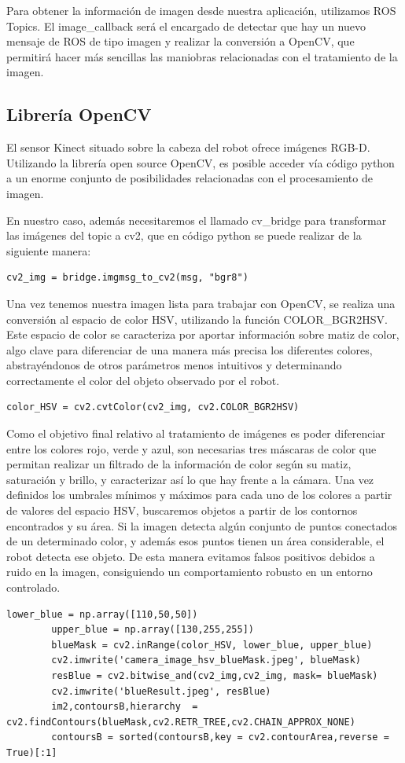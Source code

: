 \documentclass[12pt,spanish,chapterprefix, numbers=noenddot]{book}
\numberwithin{equation}{section}
\numberwithin{figure}{section}
\begin{document}
Para obtener la información de imagen desde nuestra aplicación, utilizamos ROS Topics. El image\_callback será el encargado de detectar que hay un nuevo mensaje de ROS de tipo imagen y realizar la conversión a OpenCV, que permitirá hacer más sencillas las maniobras relacionadas con el tratamiento de la imagen.
\subsection{Librería OpenCV} 
El sensor Kinect situado sobre la cabeza del robot ofrece imágenes RGB-D. Utilizando la librería open source OpenCV, es posible acceder vía código python a un enorme conjunto de posibilidades relacionadas con el procesamiento de imagen. \cite{open_cv} 

En nuestro caso, además necesitaremos el llamado cv\_bridge para transformar las imágenes del topic a cv2, que en código python se puede realizar de la siguiente manera: 
	\begin{lstlisting}[frame=single]    
    cv2_img = bridge.imgmsg_to_cv2(msg, "bgr8")
	\end{lstlisting}
Una vez tenemos nuestra imagen lista para trabajar con OpenCV, se realiza una conversión al espacio de color HSV, utilizando la función COLOR\_BGR2HSV. Este espacio de color se caracteriza por aportar información sobre matiz de color, algo clave para diferenciar de una manera más precisa los diferentes colores, abstrayéndonos de otros parámetros menos intuitivos y determinando correctamente el color del objeto observado por el robot. 
	\begin{lstlisting}[frame=single] 
    color_HSV = cv2.cvtColor(cv2_img, cv2.COLOR_BGR2HSV)
	\end{lstlisting}
Como el objetivo final relativo al tratamiento de imágenes es poder diferenciar entre los colores rojo, verde y azul, son necesarias tres máscaras de color que permitan realizar un filtrado de la información de color según su matiz, saturación y brillo, y caracterizar así lo que hay frente a la cámara. 
Una vez definidos los umbrales mínimos y máximos para cada uno de los colores a partir de valores del espacio HSV, buscaremos objetos a partir de los contornos encontrados y su área. Si la imagen detecta algún conjunto de puntos conectados de un determinado color, y además esos puntos tienen un área considerable, el robot detecta ese objeto. De esta manera evitamos falsos positivos debidos a ruido en la imagen, consiguiendo un comportamiento robusto en un entorno controlado. 
\vspace{20pt}
	\begin{lstlisting}[frame=single] 
        lower_blue = np.array([110,50,50])
        upper_blue = np.array([130,255,255])
        blueMask = cv2.inRange(color_HSV, lower_blue, upper_blue)
        cv2.imwrite('camera_image_hsv_blueMask.jpeg', blueMask)
        resBlue = cv2.bitwise_and(cv2_img,cv2_img, mask= blueMask)
        cv2.imwrite('blueResult.jpeg', resBlue)
        im2,contoursB,hierarchy  = cv2.findContours(blueMask,cv2.RETR_TREE,cv2.CHAIN_APPROX_NONE)
        contoursB = sorted(contoursB,key = cv2.contourArea,reverse = True)[:1] 
	\end{lstlisting}
\end{document}
